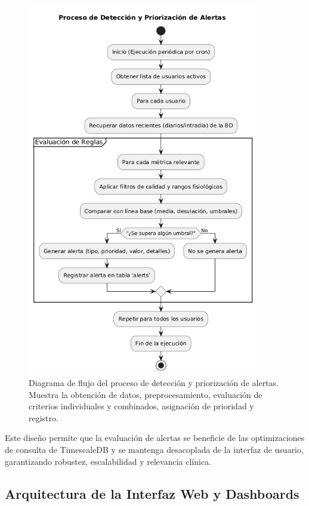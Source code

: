 \begin{figure}[htbp]
    \centering
    \includegraphics[width=0.9\textwidth,height=0.6\textheight]{imagenes/diagrama_alertas.png} 
    \caption{Diagrama de flujo del proceso de detección y priorización de alertas. Muestra la obtención de datos, preprocesamiento, evaluación de criterios individuales y combinados, asignación de prioridad y registro.}
    \label{fig:diagrama_alertas}
\end{figure}

Este diseño permite que la evaluación de alertas se beneficie de las optimizaciones de consulta de TimescaleDB y se mantenga desacoplada de la interfaz de usuario, garantizando robustez, escalabilidad y relevancia clínica.

\subsection{Arquitectura de la Interfaz Web y Dashboards}
\label{sec:arquitectura_dashboard}

